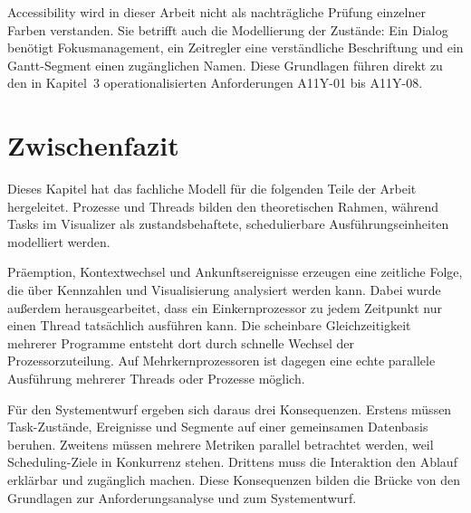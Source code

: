 Accessibility wird in dieser Arbeit nicht als nachträgliche Prüfung einzelner Farben verstanden. Sie betrifft auch die Modellierung der Zustände: Ein Dialog benötigt Fokusmanagement, ein Zeitregler eine verständliche Beschriftung und ein Gantt-Segment einen zugänglichen Namen. Diese Grundlagen führen direkt zu den in Kapitel~3 operationalisierten Anforderungen A11Y-01 bis A11Y-08.

\section{Zwischenfazit}

Dieses Kapitel hat das fachliche Modell für die folgenden Teile der Arbeit hergeleitet. Prozesse und Threads bilden den theoretischen Rahmen, während Tasks im Visualizer als zustandsbehaftete, schedulierbare Ausführungseinheiten modelliert werden.

Präemption, Kontextwechsel und Ankunftsereignisse erzeugen eine zeitliche Folge, die über Kennzahlen und Visualisierung analysiert werden kann. Dabei wurde außerdem herausgearbeitet, dass ein Einkernprozessor zu jedem Zeitpunkt nur einen Thread tatsächlich ausführen kann. Die scheinbare Gleichzeitigkeit mehrerer Programme entsteht dort durch schnelle Wechsel der Prozessorzuteilung. Auf Mehrkernprozessoren ist dagegen eine echte parallele Ausführung mehrerer Threads oder Prozesse möglich.

Für den Systementwurf ergeben sich daraus drei Konsequenzen. Erstens müssen Task-Zustände, Ereignisse und Segmente auf einer gemeinsamen Datenbasis beruhen. Zweitens müssen mehrere Metriken parallel betrachtet werden, weil Scheduling-Ziele in Konkurrenz stehen. Drittens muss die Interaktion den Ablauf erklärbar und zugänglich machen. Diese Konsequenzen bilden die Brücke von den Grundlagen zur Anforderungsanalyse und zum Systementwurf.